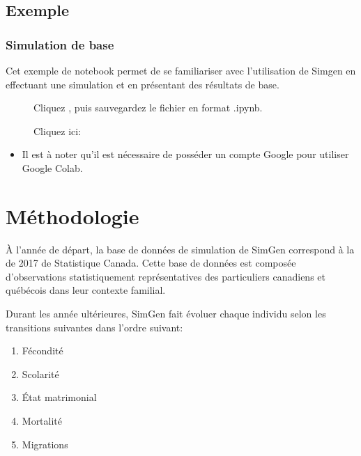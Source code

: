 \documentclass[letterpaper,10pt,french]{sphinxmanual}
\begin{document}
\subsection{Exemple}
\label{\detokenize{utilisation:exemple}}

\subsubsection{Simulation de base}
\label{\detokenize{utilisation:simulation-de-base}}
Cet exemple de notebook permet de se familiariser avec l’utilisation de Simgen en effectuant une simulation
et en présentant des résultats de base.
\begin{description}
\item[{}] \leavevmode
Cliquez , puis sauvegardez le fichier en format .ipynb.

\item[{}] \leavevmode
Cliquez ici: 

\end{description}
\begin{itemize}
\item {} 
Il est à noter qu’il est nécessaire de posséder un compte Google pour utiliser Google Colab.

\end{itemize}


\section{Méthodologie}
\label{\detokenize{methodologie:methodologie}}\label{\detokenize{methodologie:transition-models}}\label{\detokenize{methodologie::doc}}
À l’année de départ, la base de données de simulation de SimGen correspond  à
la  de 2017 de Statistique Canada.
Cette base de données est composée
d’observations statistiquement représentatives des particuliers canadiens et québécois
dans leur contexte familial.

Durant les année ultérieures, SimGen fait évoluer chaque individu selon les transitions suivantes dans l’ordre suivant:
\begin{enumerate}
%
\item {} 
Fécondité

\item {} 
Scolarité

\item {} 
État matrimonial

\item {} 
Mortalité

\item {} 
Migrations

\end{enumerate}
\end{document}
